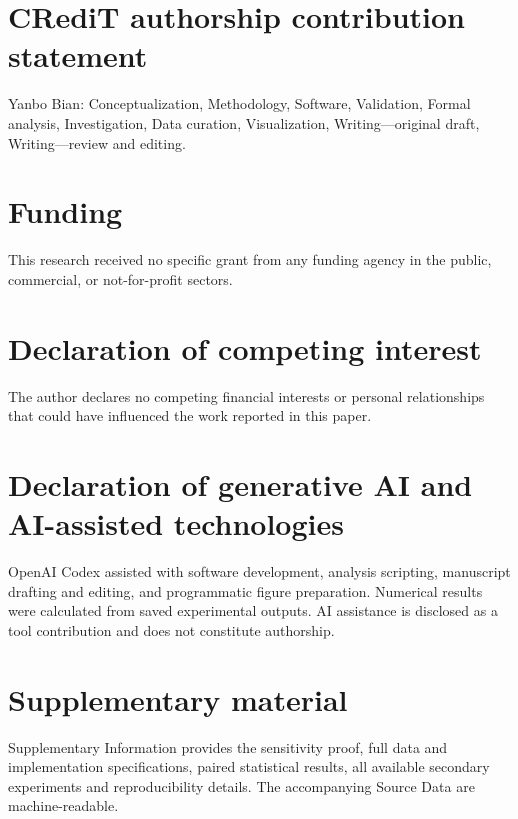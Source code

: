 \documentclass[final,5p,times]{elsarticle}
\begin{document}
\section*{CRediT authorship contribution statement}
Yanbo Bian: Conceptualization, Methodology, Software, Validation, Formal analysis, Investigation, Data curation, Visualization, Writing---original draft, Writing---review and editing.

\section*{Funding}
This research received no specific grant from any funding agency in the public, commercial, or not-for-profit sectors.

\section*{Declaration of competing interest}
The author declares no competing financial interests or personal relationships that could have influenced the work reported in this paper.

\section*{Declaration of generative AI and AI-assisted technologies}
OpenAI Codex assisted with software development, analysis scripting, manuscript drafting and editing, and programmatic figure preparation. Numerical results were calculated from saved experimental outputs. AI assistance is disclosed as a tool contribution and does not constitute authorship.

\section*{Supplementary material}
Supplementary Information provides the sensitivity proof, full data and implementation specifications, paired statistical results, all available secondary experiments and reproducibility details. The accompanying Source Data are machine-readable.

\setlength{\bibsep}{0pt plus 0.5pt}


\end{document}
